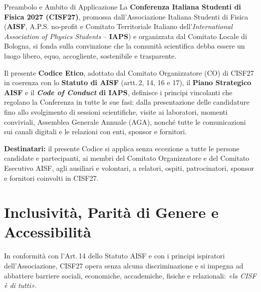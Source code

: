 \documentclass[10pt,a4paper]{article}
\begin{document}
\vspace{0.2cm}

\begin{cisfcallout}{\faBalanceScale\hspace{0.5em}Preambolo e Ambito di Applicazione}
La \textbf{Conferenza Italiana Studenti di Fisica 2027 (CISF27)}, promossa dall'Associazione Italiana Studenti di Fisica (\textbf{AISF}, A.P.S. no-profit e Comitato Territoriale Italiano dell'\textit{International Association of Physics Students} -- \textbf{IAPS}) e organizzata dal Comitato Locale di Bologna, si fonda sulla convinzione che la comunità scientifica debba essere un luogo libero, equo, accogliente, sostenibile e trasparente.

Il presente \textbf{Codice Etico}, adottato dal Comitato Organizzatore (CO) di CISF27 in coerenza con lo \textbf{Statuto di AISF} (artt.\,2, 14, 16 e 17), il \textbf{Piano Strategico AISF} e il \textbf{\textit{Code of Conduct} di IAPS}, definisce i principi vincolanti che regolano la Conferenza in tutte le sue fasi: dalla presentazione delle candidature fino allo svolgimento di sessioni scientifiche, visite ai laboratori, momenti conviviali, Assemblea Generale Annuale (AGA), nonché tutte le comunicazioni sui canali digitali e le relazioni con enti, sponsor e fornitori.

\textbf{Destinatari:} il presente Codice si applica senza eccezione a tutte le persone candidate e partecipanti, ai membri del Comitato Organizzatore e del Comitato Esecutivo AISF, agli ausiliari e volontari, a relatori, ospiti, patrocinatori, sponsor e fornitori coinvolti in CISF27.
\end{cisfcallout}

\section{Inclusività, Parità di Genere e Accessibilità}

In conformità con l'Art.\,14 dello Statuto AISF e con i principi ispiratori dell'Associazione, CISF27 opera senza alcuna discriminazione e si impegna ad abbattere barriere sociali, economiche, accademiche, fisiche e relazionali: \emph{«la CISF è di tutti»}.
\end{document}
